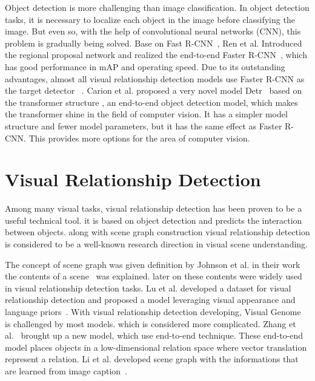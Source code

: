 Object detection is more challenging than image classification. In object detection tasks, it is necessary to localize each object in the image before classifying the image. But even so, with the help of convolutional neural networks (CNN), this problem is gradually being solved. Base on Fast R-CNN~\cite{girshick2015fast}, Ren et al. Introduced the regional proposal network and realized the end-to-end Faster R-CNN~\cite{ren2016faster}, which has good performance in mAP and operating speed. Due to its outstanding advantages, almost all visual relationship detection models use Faster R-CNN as the target detector ~\cite{yang2018graph, zellers2018neural, zhang2019graphical}. Carion et al. proposed a very novel model Detr~\cite{carion2020end} based on the transformer structure , an end-to-end object detection model, which makes the transformer shine in the field of computer vision. It has a simpler model structure and fewer model parameters, but it has the same effect as Faster R-CNN. This provides more options for the area of computer vision.

\section{Visual Relationship Detection}
Among many visual tasks, visual relationship detection has been proven to be a useful technical tool. it is based on object detection and predicts the interaction between objects. along with scene graph construction visual relationship detection is considered to be a well-known research direction in visual scene understanding.

The concept of scene graph was given definition by Johnson et al. in their work the contents of a scene~\cite{johnson2015image} was explained. later on these contents were widely used in visual relationship detection tasks. Lu et al. developed a dataset for visual relationship detection and proposed a model leveraging visual appearance and language priors~\cite{girshick2015fast}. With visual relationship detection developing, Visual Genome~\cite{krishna2017visual} is challenged by most models. which is considered more complicated. Zhang et al.~\cite{zhang2017visual} brought up a new model, which use end-to-end technique. These end-to-end model places objects in a low-dimensional relation space where vector translation represent a relation. Li et al. developed scene graph with the informations that are learned from image caption~\cite{li2017scene}.

